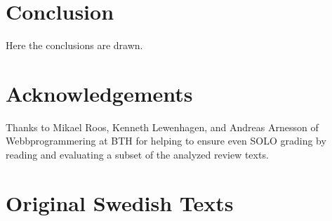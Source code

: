 \documentclass[twoside,twocolumn,a4paper,11pt,english]{article}
\begin{document}
\section{Conclusion}

Here the conclusions are drawn.




\section{Acknowledgements}

Thanks to Mikael Roos, Kenneth Lewenhagen, and Andreas Arnesson of Webbprogrammering at BTH for helping to ensure even SOLO grading by reading and evaluating a subset of the analyzed review texts.








\appendix

\section{Original Swedish Texts} \label{app:original}
\end{document}
